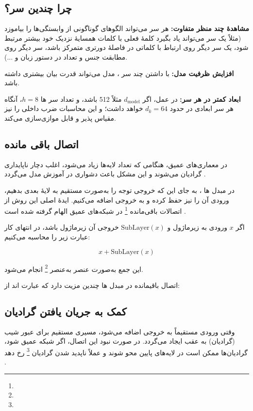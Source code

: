\subsection*{چرا چندین سر؟}

\textbf{مشاهدهٔ چند منظر متفاوت:} هر  سر می‌تواند الگوهای گوناگونی از وابستگی‌ها را بیاموزد (مثلاً یک سر می‌تواند یاد بگیرد کلمهٔ فعلی با کلمات همسایهٔ نزدیک خود بیشتر مرتبط شود، یک سر  دیگر روی ارتباط با کلماتی در فاصلهٔ دورتری متمرکز باشد، سر دیگر روی مطابقت جنس و تعداد در دستور زبان و ...).

\textbf{افزایش ظرفیت مدل:} با داشتن چند سر ، مدل می‌تواند قدرت بیان بیشتری داشته باشد.

\textbf{ابعاد کمتر در هر سر:} در عمل، اگر \( d_{\text{model}} \) مثلاً 512 باشد، و تعداد سر ها \( h = 8 \)، آنگاه هر سر  ابعادی در حدود \( d_k = 64 \) خواهد داشت؛ و این محاسبات ضرب داخلی را نیز مقیاس‌ پذیر و قابل موازی‌سازی می‌کند.


\subsection{اتصال باقی مانده}
در معماری‌های عمیق، هنگامی که تعداد لایه‌ها زیاد می‌شود، اغلب دچار ناپایداری گرادیان می‌شوند و این مشکل باعث دشواری در آموزش مدل می‌گردد \cite{hochreiter1997long,bengio1994learning}. 

در مبدل ها \cite{vaswani2017attention}، به جای این که خروجی توجه را به‌صورت مستقیم به لایهٔ بعدی بدهیم، ورودی آن را نیز حفظ کرده و به خروجی اضافه می‌کنیم. ایدهٔ اصلی این روش از اتصالات باقی‌مانده \footnote{} در شبکه‌های عمیق الهام گرفته شده است \cite{he2016deep}.

اگر \( x \) ورودی به زیرماژول و \( \text{SubLayer}(x) \) خروجی آن زیرماژول باشد، در انتهای کار عبارت زیر را محاسبه می‌کنیم:

\begin{equation}
	x + \text{SubLayer}(x)
	\label{eq:sublayer}
\end{equation}

این جمع به‌صورت عنصر به‌عنصر \footnote{} انجام می‌شود.


اتصال باقیمانده در مبدل ها چندین مزیت دارد که عبارت اند از:

\subsection*{کمک به جریان یافتن گرادیان}
وقتی ورودی مستقیماً به خروجی اضافه می‌شود، مسیری مستقیم برای عبور شیب (گرادیان) به عقب ایجاد می‌گردد.
در صورت نبود این اتصال، اگر شبکه عمیق شود، گرادیان‌ها ممکن است در لایه‌های پایین محو شوند و عملاً ناپدید شدن گرادیان \footnote{} رخ دهد \cite{hochreiter1997long,bengio1994learning}.

